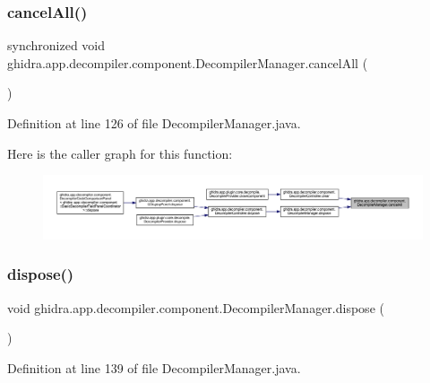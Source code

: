 \subsubsection{\texorpdfstring{cancelAll()}{cancelAll()}}
{\footnotesize\ttfamily synchronized void ghidra.\+app.\+decompiler.\+component.\+Decompiler\+Manager.\+cancel\+All (\begin{DoxyParamCaption}{ }\end{DoxyParamCaption})\hspace{0.3cm}{\ttfamily [inline]}}



Definition at line 126 of file Decompiler\+Manager.\+java.

Here is the caller graph for this function\+:
\nopagebreak
\begin{figure}[H]
\begin{center}
\leavevmode
\includegraphics[width=350pt]{classghidra_1_1app_1_1decompiler_1_1component_1_1_decompiler_manager_af4c7e68ce6789484e439dd7501856896_icgraph}
\end{center}
\end{figure}
\mbox{\label{classghidra_1_1app_1_1decompiler_1_1component_1_1_decompiler_manager_a8f2694c41dd71e004e75a5603274865f}} 
\subsubsection{\texorpdfstring{dispose()}{dispose()}}
{\footnotesize\ttfamily void ghidra.\+app.\+decompiler.\+component.\+Decompiler\+Manager.\+dispose (\begin{DoxyParamCaption}{ }\end{DoxyParamCaption})\hspace{0.3cm}{\ttfamily [inline]}}



Definition at line 139 of file Decompiler\+Manager.\+java.

